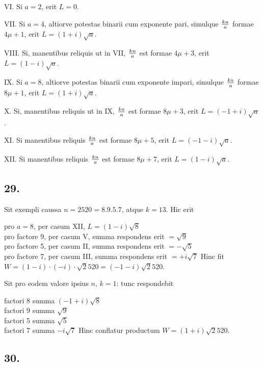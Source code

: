 \documentclass[twoside,12pt]{memoir}
\renewenvironment{quote}%
  {\list{}{\leftmargin=5em\rightmargin=0em}\item[]}%
  {\endlist}
\let\oldfrac\frac
\def\frac#1#2{\mathchoice{\tfrac{#1}{#2}}{\oldfrac{#1}{#2}}{\genfrac{}{}{}{2}{#1}{#2\mathstrut}}{\genfrac{}{}{}{3}{#1}{#2\mathstrut}}}
\begin{document}
VI. Si \(a=2\), erit \(L=0\).
 
VII. Si \(a=4\), altiorve potestas binarii cum exponente pari, simulque \(\frac{k n}{a}\) formae \(4 \mu+1\), erit \(L=(1+i) \surd a\).
 
VIII. Si, manentibus reliquis ut in VII, \(\frac{k n}{a}\) est formae \(4 \mu+3\), erit \(L=(1-i) \surd a\).
 
IX. Si \(a=8\), altiorve potestas binarii cum exponente impari, simulque \(\frac{k n}{a}\) formae \(8 \mu+1\), erit \(L=(1+i) \surd a\).\pagebreak%
 
X. Si, manentibus reliquis ut in IX, \(\frac{k n}{a}\) est formae \(8 \mu+3\), erit \(L=(-1+i) \surd a\).
 
XI. Si manentibus reliquis \(\frac{k n}{a}\) est formae \(8 \mu+5\), erit \(L=(-1-i) \surd a\). 
 
XII. Si manentibus reliquis \(\frac{k n}{a}\) est formae \(8 \mu+7\), erit \(L=(1-i) \surd a\).

\subsection*{29.}
 
Sit exempli caussa \(n=2520=8 . 9 . 5 . 7\), atque \(k=13\). Hic erit
\begin{quote}pro \(a=8\), per casum XII, \(L=(1-i) \surd 8\)\\
pro factore 9, per casum V, summa respondens erit \(=\surd 9\)\\
pro factore 5, per casum II, summa respondens erit \(=-\surd 5\)\\
pro factore 7, per casum III, summa respondens erit \(=+i \surd 7\)
\end{quote}
Hinc fit \(W=(1-i) \cdot(-i) \cdot \surd 2520=(-1-i) \surd 2520\).

Sit pro eodem valore ipsius \(n\), \(k=1\): tunc respondebit
\begin{quote}factori 8 summa \((-1+i) \surd 8\)\\
factori 9 summa \(\surd 9\)\\
factori 5 summa \(\surd 5\)\\
factori 7 summa \(-i \surd 7\)\end{quote}
Hinc conflatur productum \(W=(1+i) \surd 2520\).

\subsection*{30.}
 
\end{document}
